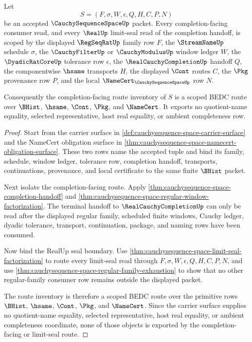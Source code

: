 \begin{theorem}
\label{thm:cauchysequence-space-scoped-completion-route-inventory}
Let
$$
S=(F,\sigma,W,\epsilon,Q,H,C,P,N)
$$
be an accepted $\CauchySequenceSpaceUp$ packet. Every completion-facing consumer read, and every $\RealUp$ limit-seal read of the completion handoff, is scoped by the displayed $\RegSeqRatUp$ family row $F$, the $\StreamNameUp$ schedule $\sigma$, the $\CauchyFilterUp$ or $\CauchyModulusUp$ window ledger $W$, the $\DyadicRatCoreUp$ tolerance row $\epsilon$, the $\RealCauchyCompletionUp$ handoff $Q$, the componentwise $\hsame$ transports $H$, the displayed $\Cont$ routes $C$, the $\Pkg$ provenance row $P$, and the local $\NameCert_{\CauchySequenceSpaceUp}$ row $N$.

Consequently the completion-facing route inventory of $S$ is a scoped BEDC route over $\BHist$, $\hsame$, $\Cont$, $\Pkg$, and $\NameCert$. It exports no quotient-name equality, selected representative, host real equality, or ambient completeness row.
\end{theorem}
\begin{proof}
Start from the carrier surface in \autoref{def:cauchysequence-space-carrier-surface} and the NameCert obligation surface in \autoref{thm:cauchysequence-space-namecert-obligation-surface}. These two rows name the accepted tuple and bind its family, schedule, window ledger, tolerance row, completion handoff, transports, continuations, provenance, and local certificate to the same finite $\BHist$ packet.

Next isolate the completion-facing route. Apply \autoref{thm:cauchysequence-space-completion-handoff} and \autoref{thm:cauchysequence-space-regular-window-factorization}. The terminal handoff to $\RealCauchyCompletionUp$ can only be read after the displayed regular family, scheduled finite windows, Cauchy ledger, dyadic tolerance, transport, continuation, package, and naming rows have been consumed.

Now bind the RealUp seal boundary. Use \autoref{thm:cauchysequence-space-limit-seal-factorization} to route every limit-seal read through $F,\sigma,W,\epsilon,Q,H,C,P,N$, and use \autoref{thm:cauchysequence-space-regular-family-exhaustion} to show that no other regular-family consumer row remains outside the displayed packet.

The route inventory is therefore a scoped BEDC route over the primitive rows $\BHist$, $\hsame$, $\Cont$, $\Pkg$, and $\NameCert$. Since the carrier surface supplies no quotient-name equality, selected representative, host real equality, or ambient completeness coordinate, none of those objects is exported by the completion-facing or limit-seal route.
\end{proof}

